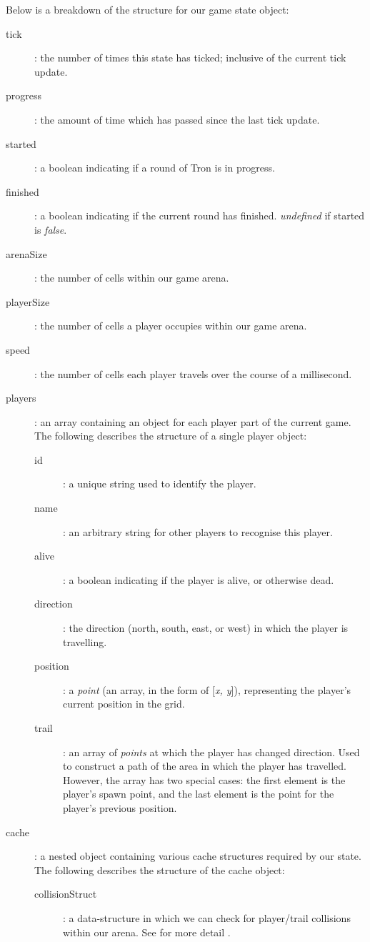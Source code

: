 \documentclass{standalone}
\begin{document}
		Below is a breakdown of the structure for our game state object:
		\begin{description}
        \item[tick]: the number of times this state has ticked; inclusive of the current tick update.
        \item[progress]: the amount of time which has passed since the last tick update.
        \item[started]: a boolean indicating if a round of Tron is in progress.
        \item[finished]: a boolean indicating if the current round has finished. \emph{undefined} if started is \emph{false}.
        \item[arenaSize]: the number of cells within our game arena.
        \item[playerSize]: the number of cells a player occupies within our game arena.
        \item[speed]: the number of cells each player travels over the course of a millisecond.
        \item[players]: an array containing an object for each player part of the current game. The following describes the structure of a single player object:
        \begin{description}
        	\item[id]: a unique string used to identify the player.
        	\item[name]: an arbitrary string for other players to recognise this player.
        	\item[alive]: a boolean indicating if the player is alive, or otherwise dead.
        	\item[direction]: the direction (north, south, east, or west) in which the player is travelling.
        	\item[position]: a \emph{point} (an array, in the form of [\emph{x, y}]), representing the player's current position in the grid.
        	\item[trail]: an array of \emph{points} at which the player has changed direction. Used to construct a path of the area in which the player has travelled. However, the array has two special cases: the first element is the player's spawn point, and the last element is the point for the player's previous position.
      	\end{description}
        \item[cache]: a nested object containing various cache structures required by our state. The following describes the structure of the cache object:
        \begin{description}
        	\item[collisionStruct]: a data-structure in which we can check for player/trail collisions within our arena. See for more detail .
      	\end{description}
    \end{description}
\end{document}
